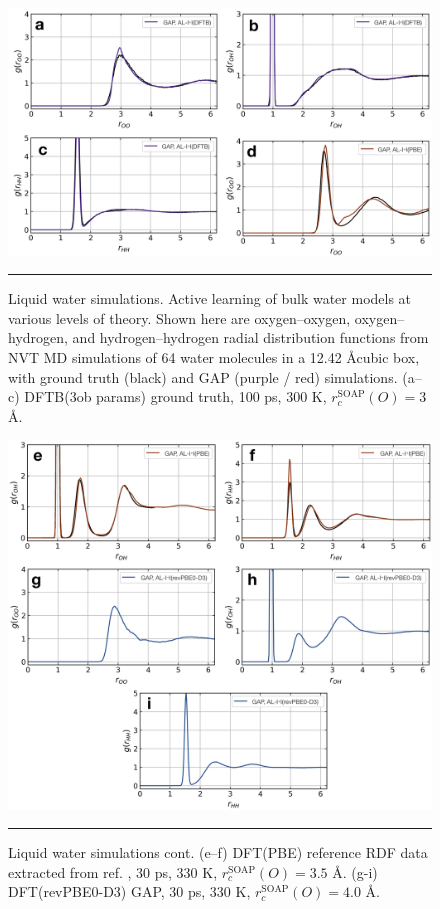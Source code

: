 \documentclass[../../main.tex]{subfiles}
\begin{document}
\begin{figure}[h!]
	\vspace{0.4cm}
	\centering
	\includegraphics[width=\textwidth]{6/gap/figs_ms/fig2a-d}
	\vspace{0.2cm}
	\hrule
	\caption{Liquid water simulations. Active learning of bulk water models at various levels of theory. Shown here are oxygen–oxygen, oxygen–hydrogen, and hydrogen–hydrogen radial distribution functions from NVT MD simulations of 64 water molecules in a 12.42 \AA cubic box, with ground truth (black) and GAP (purple / red) simulations. (a–c) DFTB(3ob params) ground truth, 100 ps, 300 K, $r_c^\text{SOAP}(O) = 3$ \AA.}
	\label{fig::ml_2a-d}
\end{figure}
\begin{figure}[h!]
	\vspace{0.4cm}
	\centering
	\includegraphics[width=\textwidth]{6/gap/figs_ms/fig2e-i}
	\vspace{0.2cm}
	\hrule
	\caption{Liquid water simulations cont. (e–f) DFT(PBE) reference RDF data extracted from ref. \cite{Zheng2018}, 30 ps, 330 K, $r_c^\text{SOAP}(O) = 3.5$ \AA. (g-i) DFT(revPBE0-D3) GAP, 30 ps, 330 K, $r_c^\text{SOAP}(O) = 4.0$ \AA.}
	\label{fig::ml_2e-i}
\end{figure}
\end{document}
